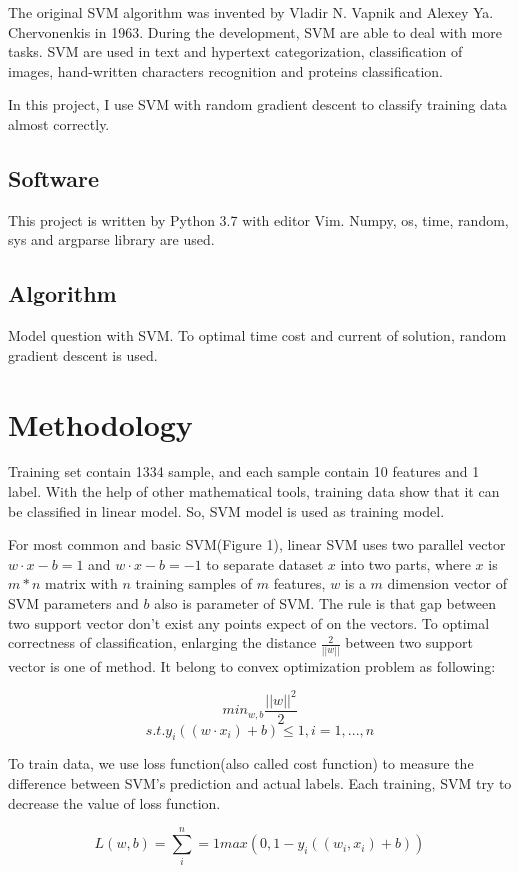 \documentclass[conference,compsoc]{IEEEtran}
\begin{document}
The original SVM algorithm was invented by Vladir N. Vapnik and
Alexey Ya. Chervonenkis in 1963. During the development, SVM are able to deal
with more tasks. SVM are used in text and hypertext categorization,
classification of images, hand-written characters recognition and proteins
classification.

In this project, I use SVM with random gradient descent to classify training
data almost correctly. 


\subsection{Software}
This project is written by Python 3.7 with editor Vim. Numpy, os, time,
random, sys and argparse library are used.

\subsection{Algorithm}
Model question with SVM. To optimal time cost and current of solution, random
gradient descent is used.

\section{Methodology}
Training set contain 1334 sample, and each sample contain 10 features and 1
label. With the help of other mathematical tools, training data show that
it can be classified in linear model. So, SVM model is used as training
model.

For most common and basic SVM(Figure 1), linear SVM uses two parallel vector
$w\cdot{x}-b=1$
and $w\cdot{x}-b=-1$ to separate dataset $x$ into two parts, where $x$ is
$m*n$ matrix with $n$ training samples of $m$ features, $w$ is a $m$ dimension
vector of SVM parameters and $b$ also is parameter of SVM. The rule is that gap
between two support vector don't exist any points expect of on the vectors.
To optimal correctness of classification, enlarging the distance
$\frac{2}{||w||}$ between two support vector is one of method. It belong to
convex optimization problem as following:

$${min}_{w,b}\frac{||w||^2}{2}$$
$$s.t. y_i((w\cdot{x_i})+b) \le1, i=1,...,n$$

To train data, we use loss function(also called cost function) to measure the
difference between SVM's prediction and actual labels. Each training, SVM try
to decrease the value of loss function. 

$$ L(w,b)=\sum^n_i=1 max(0, 1-y_i((w_i, x_i)+b)) $$
\end{document}
